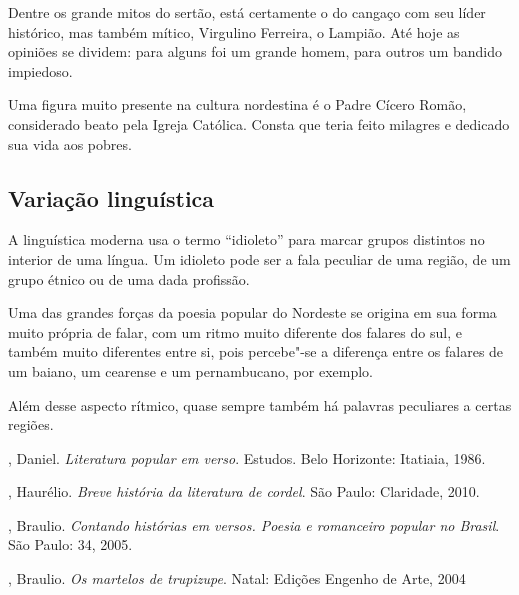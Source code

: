 Dentre os grande mitos do sertão, está certamente o do cangaço com seu
líder histórico, mas também mítico, Virgulino Ferreira, o Lampião. Até
hoje as opiniões se dividem: para alguns foi um grande homem, para
outros um bandido impiedoso. 

Uma figura muito presente na cultura nordestina é o Padre Cícero Romão,
considerado beato pela Igreja Católica. Consta que teria feito milagres
e dedicado sua vida aos pobres. 

\subsection{Variação linguística}

A linguística moderna usa o termo
``idioleto'' para marcar grupos
distintos no interior de uma língua. Um idioleto pode ser a fala
peculiar de uma região, de um grupo étnico ou de uma dada profissão. 

Uma das grandes forças da poesia popular do Nordeste se origina em sua
forma muito própria de falar, com um ritmo muito diferente dos falares
do sul, e também muito diferentes entre si, pois percebe"-se a diferença
entre os falares de um baiano, um cearense e um pernambucano, por
exemplo.

Além desse aspecto rítmico, quase sempre também há palavras peculiares a
certas regiões. 



\begin{bibliohedra}

, Daniel. \textit{Literatura popular em verso}. Estudos. Belo Horizonte: Itatiaia, 1986. 

, Haurélio. \textit{Breve história da literatura de cordel}. São Paulo: Claridade, 2010.

, Braulio. \textit{Contando histórias em versos. Poesia e romanceiro popular no Brasil}. São Paulo: 34, 2005.

, Braulio. \textit{Os martelos de trupizupe}. Natal: Edições Engenho de Arte, 2004 

\end{bibliohedra}

